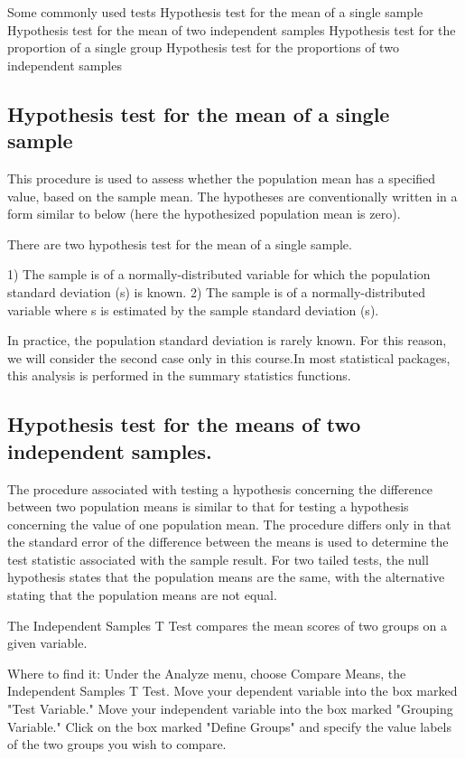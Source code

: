 Some commonly used tests
   Hypothesis test for the mean of a single sample
   Hypothesis test for the mean of two independent samples
   Hypothesis test for the proportion of a single group
   Hypothesis test for the proportions of two independent samples


\subsection{Hypothesis test for the mean of a single sample}
This procedure is used to assess whether the population mean  has a specified value, based on the sample mean. The hypotheses are conventionally written in a form similar to below (here the hypothesized population mean is zero).


There are two hypothesis test for the mean of a single sample.

1) The sample is of a normally-distributed variable for which the population standard deviation (s) is known.
2) The sample is of a normally-distributed variable where s is estimated by the sample standard deviation (s).

In practice, the population standard deviation is rarely known. For this reason, we will consider the second case only in this course.In most statistical packages, this analysis is performed in the summary statistics functions.

\subsection{Hypothesis test for the means of two independent samples.}
The procedure associated with testing a hypothesis concerning the difference between two population means is similar to that for testing a hypothesis concerning the value of one population mean. The procedure differs only in that the standard error of the difference between the means is used to determine the test statistic associated with the sample result. For two tailed tests, the null hypothesis states that the population means are the same, with the alternative stating that the population means are not equal.


The Independent Samples T Test compares the mean scores of two groups on a given variable.

Where to find it: Under the Analyze menu, choose Compare Means, the Independent Samples T Test. Move your dependent variable into the box marked "Test Variable." Move your independent variable into the box marked "Grouping Variable." Click on the box marked "Define Groups" and specify the value labels of the two groups you wish to compare.


